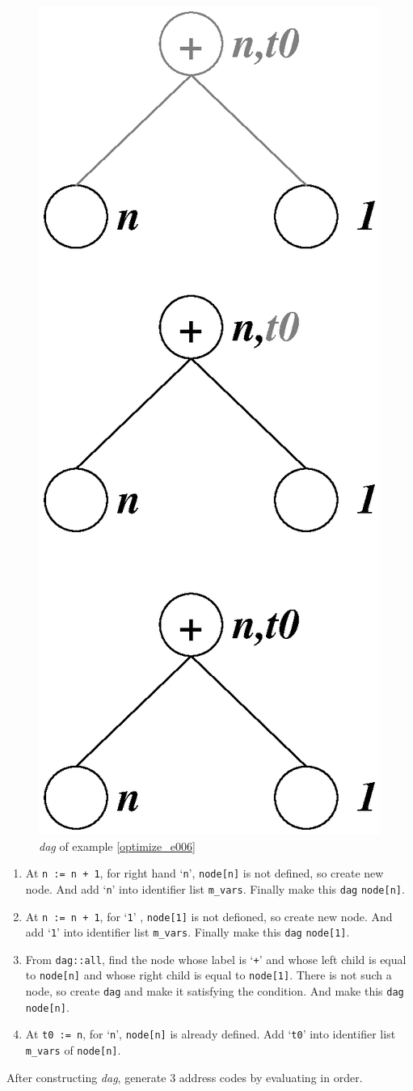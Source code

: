 \begin{Example}
\begin{figure}[htbp]
\begin{center}
\begin{latexonly}
\includegraphics[width=0.5\linewidth,height=1.01\linewidth]{opt000.eps}
\end{latexonly}
\caption{{\em dag} of example \ref{optimize_e006}}
\label{optimize_e005}
\end{center}
\end{figure}

\begin{enumerate}
\item At {\tt{n := n + 1}}, for right hand `{\tt{n}}', 
{\tt{node[n]}} is not defined, so create new node. And
add `{\tt{n}}' into identifier list {\tt{m\_vars}}.
Finally make this {\tt{dag}} {\tt{node[n]}}.

\item At {\tt{n := n + 1}}, for `{\tt{1}}' ,
 {\tt{node[1]}} is not defioned, so create new node. And 
add `{\tt{1}}' into identifier list {\tt{m\_vars}}.
Finally make this {\tt{dag}} {\tt{node[1]}}.

\item From {\tt{dag::all}}, find the node whose label is `{\tt{+}}'
and whose left child is equal to {\tt{node[n]}}
and whose right child is equal to {\tt{node[1]}}.
There is not such a node, so create {\tt{dag}}  and
make it satisfying the condition.
And make this {\tt{dag}} {\tt{node[n]}}.

\item At {\tt{t0 := n}}, for `{\tt{n}}',
{\tt{node[n]}} is already defined.
Add `{\tt{t0}}' into identifier list {\tt{m\_vars}} of {\tt{node[n]}}.
\end{enumerate}
After constructing {\em dag}, generate 3 address codes by evaluating
in order.


\end{Example}
